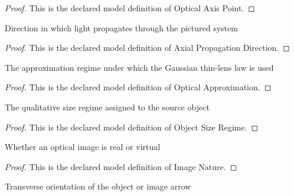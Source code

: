 \begin{proof}
  This is the declared model definition of Optical Axis Point.
\end{proof}
\begin{definition}
  \label{def:physics:phyx-mini-0148:phyxminiproblems-problemphyxmini0148-axialpropagationdirection}
  Direction in which light propagates through the pictured system
\end{definition}
\begin{proof}
  This is the declared model definition of Axial Propagation Direction.
\end{proof}
\begin{definition}
  \label{def:physics:phyx-mini-0148:phyxminiproblems-problemphyxmini0148-opticalapproximation}
  The approximation regime under which the Gaussian thin-lens law is used
\end{definition}
\begin{proof}
  This is the declared model definition of Optical Approximation.
\end{proof}
\begin{definition}
  \label{def:physics:phyx-mini-0148:phyxminiproblems-problemphyxmini0148-objectsizeregime}
  The qualitative size regime assigned to the source object
\end{definition}
\begin{proof}
  This is the declared model definition of Object Size Regime.
\end{proof}
\begin{definition}
  \label{def:physics:phyx-mini-0148:phyxminiproblems-problemphyxmini0148-imagenature}
  Whether an optical image is real or virtual
\end{definition}
\begin{proof}
  This is the declared model definition of Image Nature.
\end{proof}
\begin{definition}
  \label{def:physics:phyx-mini-0148:phyxminiproblems-problemphyxmini0148-transverseorientation}
  Transverse orientation of the object or image arrow
\end{definition}
